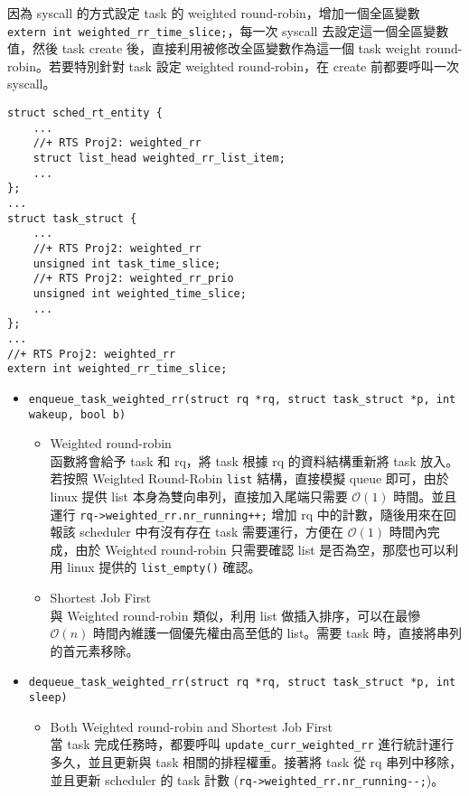\documentclass{res}
\begin{document}
\begin{resume}
因為 syscall 的方式設定 task 的 weighted round-robin，增加一個全區變數 \lstinline{extern int weighted_rr_time_slice;}，每一次 syscall 去設定這一個全區變數值，然後 task create 後，直接利用被修改全區變數作為這一個 task weight round-robin。若要特別針對 task 設定 weighted round-robin，在 create 前都要呼叫一次 syscall。

\begin{lstlisting}[frame=single]
struct sched_rt_entity {
    ...
    //+ RTS Proj2: weighted_rr
    struct list_head weighted_rr_list_item;
    ...
};
...
struct task_struct {
    ...
    //+ RTS Proj2: weighted_rr
    unsigned int task_time_slice;
    //+ RTS Proj2: weighted_rr_prio
    unsigned int weighted_time_slice;
    ...
};
...
//+ RTS Proj2: weighted_rr
extern int weighted_rr_time_slice;
\end{lstlisting}

\vspace*{.1in} 

\begin{itemize}
	\item	
	\lstinline{enqueue_task_weighted_rr(struct rq *rq, struct task_struct *p, int wakeup, bool b)}
	\begin{itemize}
		\item Weighted round-robin \\
	函數將會給予 task 和 rq，將 task 根據 rq 的資料結構重新將 task 放入。若按照 Weighted Round-Robin \lstinline{list} 結構，直接模擬 queue 即可，由於 linux 提供 list 本身為雙向串列，直接加入尾端只需要 $\mathcal{O}(1)$ 時間。並且運行 \lstinline{rq->weighted_rr.nr_running++;} 增加 rq 中的計數，隨後用來在回報該 scheduler 中有沒有存在 task 需要運行，方便在 $\mathcal{O}(1)$ 時間內完成，由於 Weighted round-robin 只需要確認 list 是否為空，那麼也可以利用 linux 提供的 \lstinline{list_empty()} 確認。
		\item Shortest Job First \\
		與 Weighted round-robin 類似，利用 list 做插入排序，可以在最慘 $\mathcal{O}(n)$ 時間內維護一個優先權由高至低的 list。需要 task 時，直接將串列的首元素移除。
	\end{itemize}
	
	\item
	\lstinline{dequeue_task_weighted_rr(struct rq *rq, struct task_struct *p, int sleep)} \\
	\begin{itemize}
		\item Both Weighted round-robin and Shortest Job First \\
		當 task 完成任務時，都要呼叫 \lstinline{update_curr_weighted_rr} 進行統計運行多久，並且更新與 task 相關的排程權重。接著將 task 從 rq 串列中移除，並且更新 scheduler 的 task 計數 (\lstinline{rq->weighted_rr.nr_running--;})。
	\end{itemize}
	

\end{itemize}
\end{resume}
\end{document}
